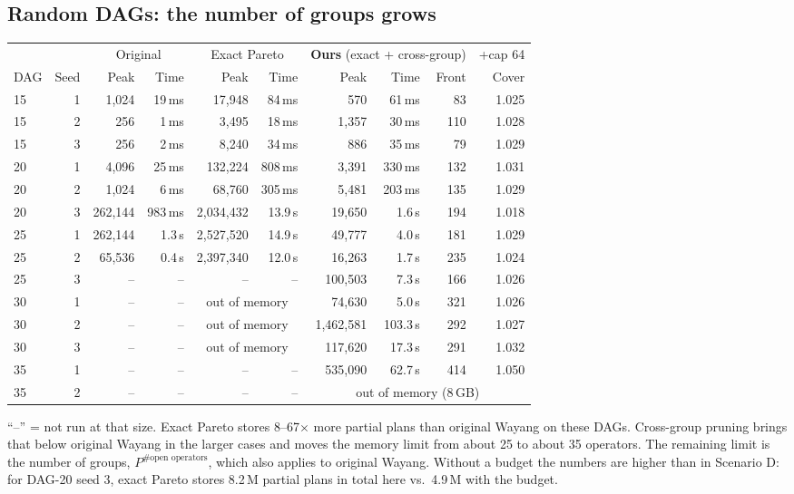 \documentclass[10pt,a4paper]{article}
\begin{document}
\subsection{Random DAGs: the number of groups grows}
\begin{center}\small
\begin{tabular}{@{}lr|rr|rr|rrr|r@{}}
\toprule
& & \multicolumn{2}{c|}{Original} & \multicolumn{2}{c|}{Exact Pareto} & \multicolumn{3}{c|}{\textbf{Ours} (exact + cross-group)} & +cap 64\\
DAG & Seed & Peak & Time & Peak & Time & Peak & Time & Front & Cover\\
\midrule
15 & 1 & 1{,}024 & 19\,ms & 17{,}948 & 84\,ms & 570 & 61\,ms & 83 & 1.025\\
15 & 2 & 256 & 1\,ms & 3{,}495 & 18\,ms & 1{,}357 & 30\,ms & 110 & 1.028\\
15 & 3 & 256 & 2\,ms & 8{,}240 & 34\,ms & 886 & 35\,ms & 79 & 1.029\\
20 & 1 & 4{,}096 & 25\,ms & 132{,}224 & 808\,ms & 3{,}391 & 330\,ms & 132 & 1.031\\
20 & 2 & 1{,}024 & 6\,ms & 68{,}760 & 305\,ms & 5{,}481 & 203\,ms & 135 & 1.029\\
20 & 3 & 262{,}144 & 983\,ms & 2{,}034{,}432 & 13.9\,s & 19{,}650 & 1.6\,s & 194 & 1.018\\
25 & 1 & 262{,}144 & 1.3\,s & 2{,}527{,}520 & 14.9\,s & 49{,}777 & 4.0\,s & 181 & 1.029\\
25 & 2 & 65{,}536 & 0.4\,s & 2{,}397{,}340 & 12.0\,s & 16{,}263 & 1.7\,s & 235 & 1.024\\
25 & 3 & -- & -- & -- & -- & 100{,}503 & 7.3\,s & 166 & 1.026\\
30 & 1 & -- & -- & \multicolumn{2}{c|}{out of memory} & 74{,}630 & 5.0\,s & 321 & 1.026\\
30 & 2 & -- & -- & \multicolumn{2}{c|}{out of memory} & 1{,}462{,}581 & 103.3\,s & 292 & 1.027\\
30 & 3 & -- & -- & \multicolumn{2}{c|}{out of memory} & 117{,}620 & 17.3\,s & 291 & 1.032\\
35 & 1 & -- & -- & -- & -- & 535{,}090 & 62.7\,s & 414 & 1.050\\
35 & 2 & -- & -- & -- & -- & \multicolumn{4}{c}{out of memory (8\,GB)}\\
\bottomrule
\end{tabular}
\end{center}
``--'' = not run at that size. Exact Pareto stores 8--67$\times$ more partial plans than original Wayang on these
DAGs. Cross-group pruning brings that below original Wayang in the larger cases and moves the memory limit from
about 25 to about 35 operators. The remaining limit is the number of groups, $P^{\#\text{open operators}}$, which
also applies to original Wayang. Without a budget the numbers are higher than in Scenario D: for DAG-20 seed 3, exact
Pareto stores 8.2\,M partial plans in total here vs.\ 4.9\,M with the budget.
\end{document}
